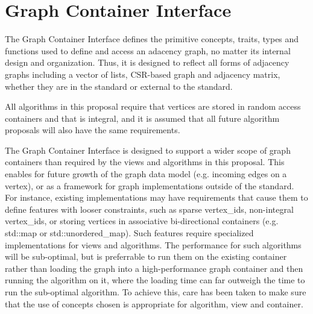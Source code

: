 
\section{Graph Container Interface}

The Graph Container Interface defines the primitive concepts, traits, types and functions used to define and access an adacency graph, no matter its internal design and organization. Thus, it is designed to reflect all forms of adjacency graphs including a vector of lists, CSR-based graph and adjacency matrix, whether they are in the standard or external to the standard.

All algorithms in this proposal require that vertices are stored in random access containers and that  is integral, and it is assumed that all future algorithm proposals will also have the same requirements. 

The Graph Container Interface is designed to support a wider scope of graph containers than required by the views and algorithms in this proposal. This enables for future growth of the graph data model (e.g. incoming edges on a vertex), or as a framework for graph implementations outside of the standard. For instance, existing implementations may have requirements that cause them to define features with looser constraints, such as sparse vertex\_ids, non-integral vertex\_ids, or storing vertices in associative bi-directional containers (e.g. std::map or std::unordered\_map). Such features require specialized implementations for views and algorithms. The performance for such algorithms will be sub-optimal, but is preferrable to run them on the existing container rather than loading the graph into a high-performance graph container and then running the algorithm on it, where the loading time can far outweigh the time to run the sub-optimal algorithm. To achieve this, care has been taken to make sure that the use of concepts chosen is appropriate for algorithm, view and container.





